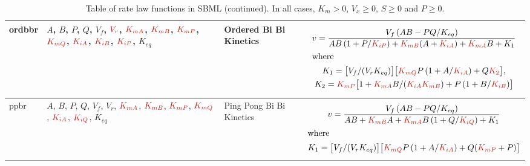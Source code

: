 \documentclass[10pt]{cekarticle}
\newcommand{\changed}[1]{\textcolor{BrickRed}{#1}}
\newenvironment{blockChanged}{\color{BrickRed}}{}
\begin{document}
\begin{table}[ht]
\begin{tabular}{|p{0.45in}|>{\raggedright}m{0.77in}|>{\raggedright}m{1.1in}|m{3.45in}|}
ordbbr & $A$, $B$, $P$, $Q$, $V_f$, $\changed{V_r}$, $\changed{K_{mA}}$, $\changed{K_{mB}}$, $\changed{K_{mP}}$, $\changed{K_{mQ}}$, 
$\changed{K_{iA}}$, $\changed{K_{iB}}$, $\changed{K_{iP}}$, $K_{eq}$ & Ordered Bi Bi Kinetics &
\begin{blockChanged}
\begin{gather*}
v = \frac{V_f
\left( A B - P Q/K_{eq}\right) }{A B \left( 1 + P/\changed{K_{iP}}\right) + \changed{K_{mB}}
(A + \changed{K_{iA}}) + \changed{K_{mA}} B + K_1} \\
\intertext{where}
K_1 = \bigl[ V_f / (V_r K_{eq}) \bigr] \bigl[ \changed{K_{mQ}} P \left( 1 + A/\changed{K_{iA}}\right) + Q \changed{K_2} \bigr] ,\\
K_2 = \changed{K_{mP}} \bigl[ 1 + \changed{K_{mA}} B /(\changed{K_{iA}} \changed{K_{mB}}) + P \left( 1 + B/\changed{K_{iB}} \right) \bigr]
\end{gather*}
\end{blockChanged}
\\ \hline

ppbr & $A$, $B$, $P$, $Q$, $V_f$, $V_r$, $\changed{K_{mA}}$, $\changed{K_{mB}}$, $\changed{K_{mP}}$, $\changed{K_{mQ}}$,
$\changed{K_{iA}}$, $\changed{K_{iQ}}$, $K_{eq}$ & Ping Pong Bi Bi Kinetics &
\begin{blockChanged}
\begin{gather*}
v = \frac{V_f
\left( A B - P Q /K_{eq} \right) }{A B + \changed{K_{mB}} A + \changed{K_{mA}} B \left( 1 +
  Q/\changed{K_{iQ}}\right)+ K_1 } \\
\intertext{where}
K_1 = \bigl[ V_f/(V_r K_{eq}) \bigr]
\bigl[ \changed{K_{mQ}} P \left( 1 + A/\changed{K_{iA}} \right) + Q (\changed{K_{mP}} + P) \bigr]
\end{gather*}
\end{blockChanged}
\\ \hline

\end{tabular}
\caption{Table of rate law functions in SBML (continued).  In all cases, $K_m > 0$, $V_x \geq 0$, $S
  \geq 0$ and $P \geq 0$.}
\end{table}
\end{document}
